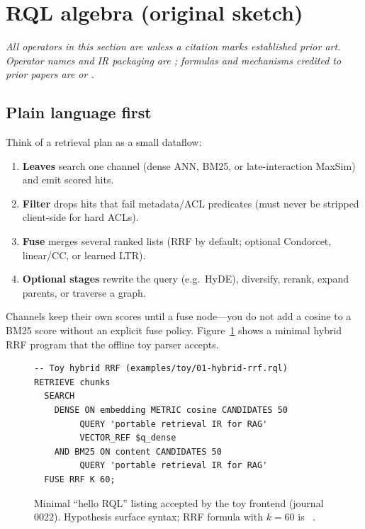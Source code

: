 \section{RQL algebra (original sketch)}
\label{sec:algebra}

\noindent\textit{All operators in this section are \hypothesis{} unless a citation marks established prior art.
Operator \emph{names} and IR packaging are \hypothesis{}; formulas and mechanisms credited to prior papers are \established{} or \authoronly{}.}

\subsection{Plain language first}
Think of a retrieval plan as a small dataflow:
\begin{enumerate}[leftmargin=*]
  \item \textbf{Leaves} search one channel (dense ANN, BM25, or late-interaction MaxSim) and emit scored hits.
  \item \textbf{Filter} drops hits that fail metadata/ACL predicates (must never be stripped client-side for hard ACLs).
  \item \textbf{Fuse} merges several ranked lists (RRF by default; optional Condorcet, linear/CC, or learned LTR).
  \item \textbf{Optional stages} rewrite the query (e.g.\ HyDE), diversify, rerank, expand parents, or traverse a graph.
\end{enumerate}
Channels keep their own scores until a fuse node---you do not add a cosine to a BM25 score without an explicit fuse policy.
Figure~\ref{fig:hello-rql} shows a minimal hybrid RRF program that the offline toy parser accepts.

\begin{figure}[t]
\begin{lstlisting}
-- Toy hybrid RRF (examples/toy/01-hybrid-rrf.rql)
RETRIEVE chunks
  SEARCH
    DENSE ON embedding METRIC cosine CANDIDATES 50
         QUERY 'portable retrieval IR for RAG'
         VECTOR_REF $q_dense
    AND BM25 ON content CANDIDATES 50
         QUERY 'portable retrieval IR for RAG'
  FUSE RRF K 60;
\end{lstlisting}
\caption{Minimal ``hello RQL'' listing accepted by the toy frontend (journal 0022).
Hypothesis surface syntax; RRF formula with $k{=}60$ is \established{}~\citep{cormack2009rrf}.}
\label{fig:hello-rql}
\end{figure}

